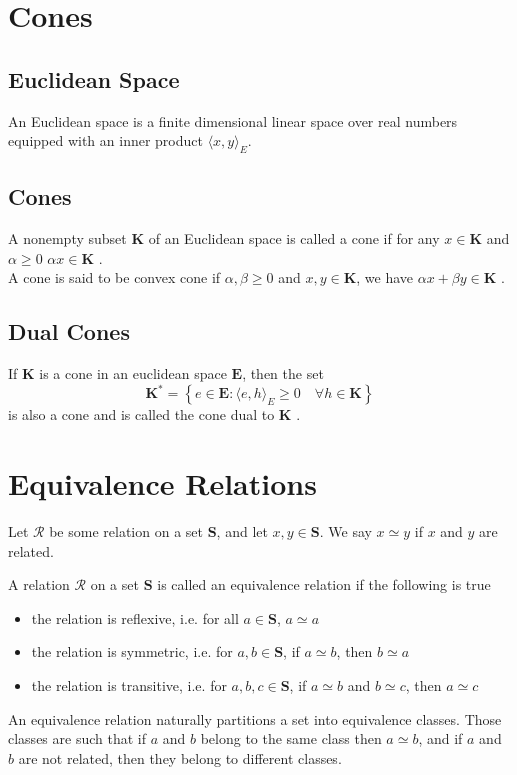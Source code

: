 \appendix



\section{Cones} \label{cones}
\subsection{Euclidean Space}
An Euclidean space is a finite dimensional linear space over real numbers equipped with an inner product $\langle x,y \rangle_E$.

\subsection{Cones}
A nonempty subset $\textbf{K}$ of an Euclidean space is called a cone if for any $x \in \textbf{K}$ and $\alpha \geq 0$ $\alpha x \in \textbf{K}$ \cite{bertsimas_tsitsiklis_1997}.\\
A cone is said to be convex cone if $\alpha, \beta \geq 0$ and $x, y \in \textbf{K}$, we have $\alpha x + \beta y \in \textbf{K}$ \cite{ben-tal_ghaoui_nemirovski_2009}.

\subsection{Dual Cones}
If $\textbf{K}$ is a cone in an euclidean space $\textbf{E}$, then the set 
\begin{equation*}
    \textbf{K}^* = \left\{ e \in \textbf{E}:\langle e,h \rangle_E \geq 0 \quad \forall h \in \textbf{K} \right\}
\end{equation*}
is also a cone and is called the cone dual to $\textbf{K}$ \cite{ben-tal_ghaoui_nemirovski_2009}.

\section{Equivalence Relations} \label{EqRel}
Let $\mathcal{R}$ be some relation on a set $\mathbf{S}$, and let $x,y \in \mathbf{S}$. We say $x \simeq y$ if $x$ and $y$ are related.
 
A relation $\mathcal{R}$ on a set $\mathbf{S}$ is called an equivalence relation if the following is true
\begin{itemize}
	\item the relation is reflexive, i.e. for all $a \in \mathbf{S}$, $a \simeq a$
	\item the relation is symmetric, i.e. for $a,b \in \mathbf{S}$, if $a \simeq b$, then $b \simeq a$
	\item the relation is transitive, i.e. for $a, b, c \in \mathbf{S}$, if $a \simeq b$ and $b \simeq c$, then $a \simeq c$
\end{itemize}
An equivalence relation naturally partitions a set into equivalence classes. Those classes are such that if $a$ and $b$ belong to the same class then $a \simeq b$, and if $a$ and $b$ are not related, then they belong to different classes.

